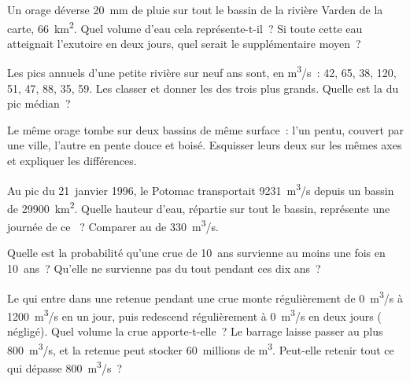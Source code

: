\begin{exercise}[$\star\star$]\label{exo:g10:drainage-basins:7}
Un orage déverse \qty{20}{mm} de pluie sur tout le bassin de la rivière
Varden de la carte, \qty{66}{km^2}. Quel volume d'eau cela représente-t-il~?
Si toute cette eau atteignait l'exutoire en deux jours, quel serait le 
supplémentaire moyen~?
\end{exercise}

\begin{exercise}[$\star\star$]\label{exo:g10:drainage-basins:8}
Les pics annuels d'une petite rivière sur neuf ans sont, en \unit{m^3/s}~:
\num{42}, \num{65}, \num{38}, \num{120}, \num{51}, \num{47}, \num{88},
\num{35}, \num{59}. Les classer et donner les  des trois
plus grands. Quelle est la  du pic médian~?
\end{exercise}

\begin{exercise}[$\star\star$]\label{exo:g10:drainage-basins:9}
Le même orage tombe sur deux bassins de même surface~: l'un pentu, couvert
par une ville, l'autre en pente douce et boisé. Esquisser leurs deux
 sur les mêmes axes et expliquer les différences.
\end{exercise}

\begin{exercise}[$\star\star$]\label{exo:g10:drainage-basins:10}
Au pic du 21~janvier 1996, le Potomac transportait \qty{9231}{m^3/s} depuis
un bassin de \qty{29900}{km^2}. Quelle hauteur d'eau, répartie sur tout le
bassin, représente une journée de ce ~? Comparer au  de
\qty{330}{m^3/s}.
\end{exercise}

\begin{exercise}[$\star\star$]\label{exo:g10:drainage-basins:11}
Quelle est la probabilité qu'une crue de \num{10}~ans survienne au moins une
fois en \num{10}~ans~? Qu'elle ne survienne pas du tout pendant ces dix
ans~?
\end{exercise}

\begin{exercise}[$\star\star\star$]\label{exo:g10:drainage-basins:12}
Le  qui entre dans une retenue pendant une crue monte régulièrement de
\qty{0}{m^3/s} à \qty{1200}{m^3/s} en un jour, puis redescend régulièrement
à \qty{0}{m^3/s} en deux jours ( négligé). Quel volume la crue
apporte-t-elle~? Le barrage laisse passer au plus \qty{800}{m^3/s}, et la
retenue peut stocker \num{60}~millions de \unit{m^3}. Peut-elle retenir tout
ce qui dépasse \qty{800}{m^3/s}~?
\end{exercise}

